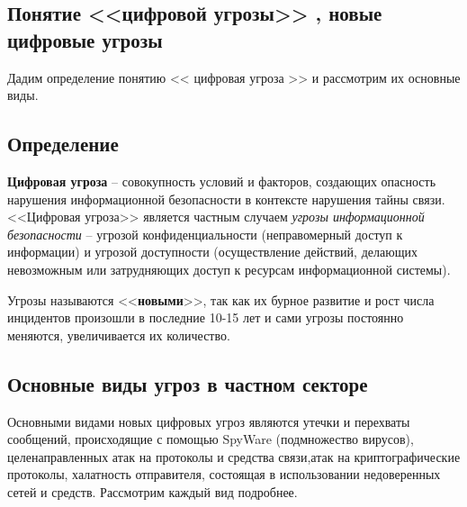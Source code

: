 \parindent=1cm %
\begin{center}
	
	\section{Понятие <<цифровой угрозы>> , новые цифровые угрозы}
	
\end{center}

Дадим определение понятию << цифровая угроза >> и рассмотрим их основные виды.
\subsection{Определение}


	\textbf{Цифровая угроза} -- совокупность условий и факторов, создающих опасность нарушения информационной безопасности  в контексте нарушения тайны связи.%
<<Цифровая угроза>> является частным случаем \textit{угрозы информационной безопасности} -- угрозой конфиденциальности (неправомерный доступ к информации) и угрозой доступности (осуществление действий, делающих невозможным или затрудняющих доступ к ресурсам информационной системы). 

Угрозы называются <<\textbf{новыми}>>, так как их бурное развитие и рост числа инцидентов произошли в последние 10-15 лет и сами угрозы постоянно меняются, увеличивается их количество.  

\subsection{Основные виды угроз в частном секторе}

	Основными видами новых цифровых  угроз являются  утечки и перехваты сообщений, происходящие с помощью  SpyWare (подмножество вирусов),  целенаправленных атак  на протоколы и средства связи,атак на криптографические протоколы, халатность отправителя, состоящая в использовании недоверенных  сетей и средств. Рассмотрим каждый вид  подробнее.
	

